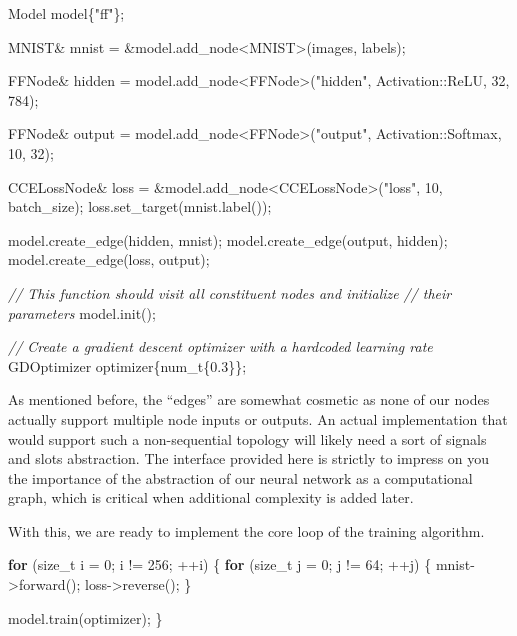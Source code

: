 \documentclass[
]{article}
\newenvironment{Shaded}{}{}
\newcommand{\CommentTok}[1]{\textcolor[rgb]{0.38,0.63,0.69}{\textit{#1}}}
\newcommand{\ControlFlowTok}[1]{\textcolor[rgb]{0.00,0.44,0.13}{\textbf{#1}}}
\newcommand{\DataTypeTok}[1]{\textcolor[rgb]{0.56,0.13,0.00}{#1}}
\newcommand{\DecValTok}[1]{\textcolor[rgb]{0.25,0.63,0.44}{#1}}
\newcommand{\FloatTok}[1]{\textcolor[rgb]{0.25,0.63,0.44}{#1}}
\newcommand{\NormalTok}[1]{#1}
\newcommand{\StringTok}[1]{\textcolor[rgb]{0.25,0.44,0.63}{#1}}
\begin{document}
\begin{Shaded}
\begin{Highlighting}[]
\NormalTok{    Model model\{}\StringTok{"ff"}\NormalTok{\};}

\NormalTok{    MNIST\& mnist = \&model.add\_node\textless{}MNIST\textgreater{}(images, labels);}

\NormalTok{    FFNode\& hidden = model.add\_node\textless{}FFNode\textgreater{}(}\StringTok{"hidden"}\NormalTok{, Activation::ReLU, }\DecValTok{32}\NormalTok{, }\DecValTok{784}\NormalTok{);}

\NormalTok{    FFNode\& output}
\NormalTok{        = model.add\_node\textless{}FFNode\textgreater{}(}\StringTok{"output"}\NormalTok{, Activation::Softmax, }\DecValTok{10}\NormalTok{, }\DecValTok{32}\NormalTok{);}

\NormalTok{    CCELossNode\& loss = \&model.add\_node\textless{}CCELossNode\textgreater{}(}\StringTok{"loss"}\NormalTok{, }\DecValTok{10}\NormalTok{, batch\_size);}
\NormalTok{    loss.set\_target(mnist.label());}

\NormalTok{    model.create\_edge(hidden, mnist);}
\NormalTok{    model.create\_edge(output, hidden);}
\NormalTok{    model.create\_edge(loss, output);}
    
    \CommentTok{// This function should visit all constituent nodes and initialize}
    \CommentTok{// their parameters}
\NormalTok{    model.init();}
    
    \CommentTok{// Create a gradient descent optimizer with a hardcoded learning rate}
\NormalTok{    GDOptimizer optimizer\{}\DataTypeTok{num\_t}\NormalTok{\{}\FloatTok{0.3}\NormalTok{\}\};}
\end{Highlighting}
\end{Shaded}

As mentioned before, the ``edges'' are somewhat cosmetic as none of our
nodes actually support multiple node inputs or outputs. An actual
implementation that would support such a non-sequential topology will
likely need a sort of signals and slots abstraction. The interface
provided here is strictly to impress on you the importance of the
abstraction of our neural network as a computational graph, which is
critical when additional complexity is added later.

With this, we are ready to implement the core loop of the training
algorithm.

\begin{Shaded}
\begin{Highlighting}[]
    \ControlFlowTok{for}\NormalTok{ (}\DataTypeTok{size\_t}\NormalTok{ i = }\DecValTok{0}\NormalTok{; i != }\DecValTok{256}\NormalTok{; ++i)}
\NormalTok{    \{}
        \ControlFlowTok{for}\NormalTok{ (}\DataTypeTok{size\_t}\NormalTok{ j = }\DecValTok{0}\NormalTok{; j != }\DecValTok{64}\NormalTok{; ++j)}
\NormalTok{        \{}
\NormalTok{            mnist{-}\textgreater{}forward();}
\NormalTok{            loss{-}\textgreater{}reverse();}
\NormalTok{        \}}

\NormalTok{        model.train(optimizer);}
\NormalTok{    \}}
\end{Highlighting}
\end{Shaded}
\end{document}
